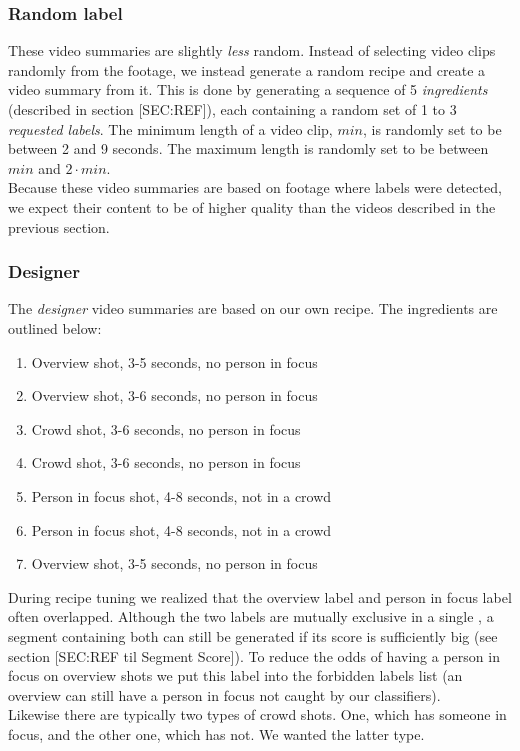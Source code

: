 \subsubsection{Random label}
%
These video summaries are slightly \textit{less} random. Instead of selecting video clips randomly from the footage, we instead generate a random recipe and create a video summary from it. This is done by generating a sequence of 5 \textit{ingredients} (described in section [SEC:REF]), each containing a random set of 1 to 3 \textit{requested labels}. The minimum length of a video clip, $min$, is randomly set to be between 2 and 9 seconds. The maximum length is randomly set to be between $min$ and $2 \cdot min$.\\
Because these video summaries are based on footage where labels were detected, we expect their content to be of higher quality than the videos described in the previous section.
%
\subsubsection{Designer}
%
The \textit{designer} video summaries are based on our own recipe. The ingredients are outlined below:
\begin{enumerate}
\item Overview shot, 3-5 seconds, no person in focus
\item Overview shot, 3-6 seconds, no person in focus
\item Crowd shot, 3-6 seconds, no person in focus
\item Crowd shot, 3-6 seconds, no person in focus
\item Person in focus shot, 4-8 seconds, not in a crowd
\item Person in focus shot, 4-8 seconds, not in a crowd
\item Overview shot, 3-5 seconds, no person in focus
\end{enumerate}
%
During recipe tuning we realized that the overview label and person in focus label often overlapped. Although the two labels are mutually exclusive in a single 
, a segment containing both can still be generated if its score is sufficiently big (see section [SEC:REF til Segment Score]). To reduce the odds of having a person in focus on overview shots we put this label into the forbidden labels list (an overview can still have a person in focus not caught by our classifiers).\\
Likewise there are typically two types of crowd shots. One, which has someone in focus, and the other one, which has not. We wanted the latter type.
%
